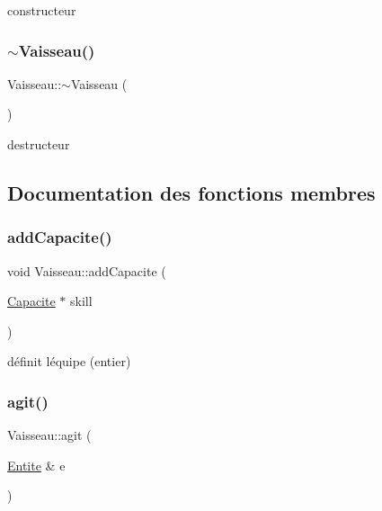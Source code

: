 constructeur 

\mbox{\label{class_vaisseau_a3360bd62af7a7aaf5732b86d639a0674}} 
\subsubsection{\texorpdfstring{$\sim$\+Vaisseau()}{~Vaisseau()}}
{\footnotesize\ttfamily Vaisseau\+::$\sim$\+Vaisseau (\begin{DoxyParamCaption}{ }\end{DoxyParamCaption})\hspace{0.3cm}{\ttfamily [override]}}



destructeur 



\subsection{Documentation des fonctions membres}
\mbox{\label{class_vaisseau_a04d7069231187e7dba26a06a0aaf2508}} 
\subsubsection{\texorpdfstring{add\+Capacite()}{addCapacite()}}
{\footnotesize\ttfamily void Vaisseau\+::add\+Capacite (\begin{DoxyParamCaption}\item[{\hyperlink{class_capacite}{Capacite} $\ast$}]{skill }\end{DoxyParamCaption})}



définit l\textquotesingle{}équipe (entier) 

\mbox{\label{class_vaisseau_a0cd6733845f221c2a5a9d7ccd7f43137}} 
\subsubsection{\texorpdfstring{agit()}{agit()}}
{\footnotesize\ttfamily Vaisseau\+::agit (\begin{DoxyParamCaption}\item[{\hyperlink{class_entite}{Entite} \&}]{e }\end{DoxyParamCaption})\hspace{0.3cm}{\ttfamily [virtual]}}



